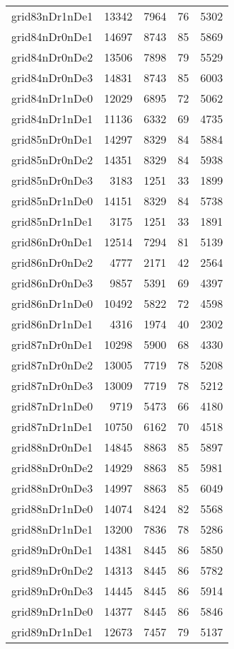 \begin{longtable}{lrrrr}
grid83nDr1nDe1 & 13342 & 7964 & 76 & 5302 \\
grid84nDr0nDe1 & 14697 & 8743 & 85 & 5869 \\
grid84nDr0nDe2 & 13506 & 7898 & 79 & 5529 \\
grid84nDr0nDe3 & 14831 & 8743 & 85 & 6003 \\
grid84nDr1nDe0 & 12029 & 6895 & 72 & 5062 \\
grid84nDr1nDe1 & 11136 & 6332 & 69 & 4735 \\
grid85nDr0nDe1 & 14297 & 8329 & 84 & 5884 \\
grid85nDr0nDe2 & 14351 & 8329 & 84 & 5938 \\
grid85nDr0nDe3 & 3183 & 1251 & 33 & 1899 \\
grid85nDr1nDe0 & 14151 & 8329 & 84 & 5738 \\
grid85nDr1nDe1 & 3175 & 1251 & 33 & 1891 \\
grid86nDr0nDe1 & 12514 & 7294 & 81 & 5139 \\
grid86nDr0nDe2 & 4777 & 2171 & 42 & 2564 \\
grid86nDr0nDe3 & 9857 & 5391 & 69 & 4397 \\
grid86nDr1nDe0 & 10492 & 5822 & 72 & 4598 \\
grid86nDr1nDe1 & 4316 & 1974 & 40 & 2302 \\
grid87nDr0nDe1 & 10298 & 5900 & 68 & 4330 \\
grid87nDr0nDe2 & 13005 & 7719 & 78 & 5208 \\
grid87nDr0nDe3 & 13009 & 7719 & 78 & 5212 \\
grid87nDr1nDe0 & 9719 & 5473 & 66 & 4180 \\
grid87nDr1nDe1 & 10750 & 6162 & 70 & 4518 \\
grid88nDr0nDe1 & 14845 & 8863 & 85 & 5897 \\
grid88nDr0nDe2 & 14929 & 8863 & 85 & 5981 \\
grid88nDr0nDe3 & 14997 & 8863 & 85 & 6049 \\
grid88nDr1nDe0 & 14074 & 8424 & 82 & 5568 \\
grid88nDr1nDe1 & 13200 & 7836 & 78 & 5286 \\
grid89nDr0nDe1 & 14381 & 8445 & 86 & 5850 \\
grid89nDr0nDe2 & 14313 & 8445 & 86 & 5782 \\
grid89nDr0nDe3 & 14445 & 8445 & 86 & 5914 \\
grid89nDr1nDe0 & 14377 & 8445 & 86 & 5846 \\
grid89nDr1nDe1 & 12673 & 7457 & 79 & 5137 \\

\end{longtable}
